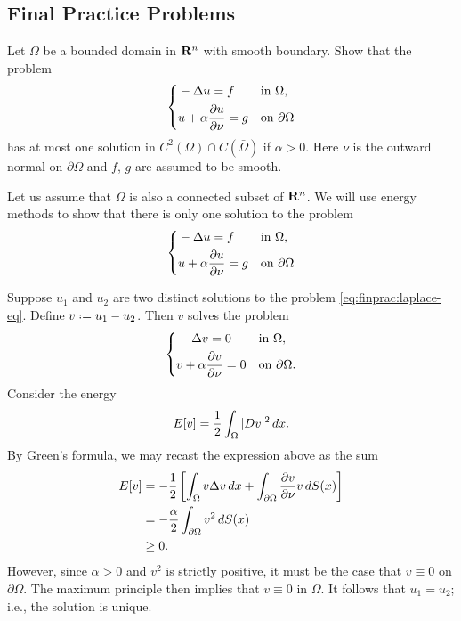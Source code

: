 \subsection{Final Practice Problems}
\begin{problem}
  Let \(\Omega\) be a bounded domain in \(\mathbf{R}^n\) with smooth boundary. Show
  that the problem
  \[
    \left\{
      \begin{aligned}
        &-\Delta u=f&&\text{in \(\Omega\),}\\
        &u+\alpha\frac{\partial u}{\partial\nu}=g&&\text{on \(\partial\Omega\)}
      \end{aligned}
    \right.
  \]
  has at most one solution in \(C^2(\Omega)\cap C(\bar\Omega)\) if
  \(\alpha>0\). Here \(\nu\) is the outward normal on \(\partial\Omega\)
  and \(f\), \(g\) are assumed to be smooth.
\end{problem}
\begin{solution*}
  Let us assume that \(\Omega\) is also a connected subset of \(\mathbf{R}^n\). We
  will use energy methods to show that there is only one solution to the
  problem
  \begin{equation}
    \label{eq:finprac:laplace-eq}
    \left\{
      \begin{aligned}
        &-\Delta u=f&&\text{in \(\Omega\),}\\
        &u+\alpha\frac{\partial u}{\partial\nu}=g&&\text{on \(\partial\Omega\)}
      \end{aligned}
    \right.
  \end{equation}

  Suppose \(u_1\) and \(u_2\) are two distinct solutions to the problem
  \eqref{eq:finprac:laplace-eq}. Define \(v\defeq u_1-u_2\). Then \(v\)
  solves the problem
  \[
    \left\{
      \begin{aligned}
        &-\Delta v=0&&\text{in \(\Omega\),}\\
        &v+\alpha\frac{\partial v}{\partial\nu}=0&&\text{on \(\partial\Omega\).}
      \end{aligned}
    \right.
  \]
  Consider the energy
  \[
    E[v]=\frac{1}{2}\int_\Omega|Dv|^2\mathop{}\!d x.
  \]
  By Green's formula, we may recast the expression above as the sum
  \begin{align*}
    E[v]
    &=-\frac{1}{2}
      \left[%
      \int_\Omega v\Lap v\diff x%
      +\int_{\partial\Omega}\frac{\partial v}{\partial\nu }v\diff S(x)%
      \right]\\
    &=-\frac{\alpha}{2}\int_{\partial\Omega} v^2\diff S(x)\\
    &\geq 0.
  \end{align*}
  However, since \(\alpha>0\) and \(v^2\) is strictly positive, it must be
  the case that \(v\equiv 0\) on \(\partial\Omega\). The maximum principle
  then implies that \(v\equiv 0\) in \(\Omega\). It follows that
  \(u_1=u_2\); i.e., the solution is unique.
\end{solution*}

